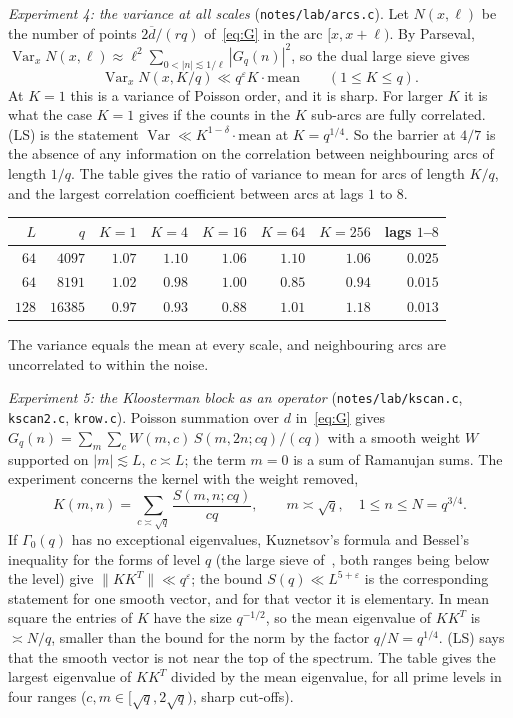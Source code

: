 \documentclass[11pt]{amsart}
\theoremstyle{definition}
\theoremstyle{remark}
\numberwithin{equation}{section}
\newcommand{\eps}{\varepsilon}
\newcommand{\inv}[1]{\overline{#1}}
\begin{document}
\emph{Experiment 4: the variance at all scales}
(\texttt{notes/lab/arcs.c}).  Let $N(x,\ell)$ be the number of points
$2\inv d/(rq)$ of~\eqref{eq:G} in the arc $[x,x+\ell)$.  By Parseval,
$\operatorname{Var}_xN(x,\ell)\approx\ell^2\sum_{0<|n|\lesssim1/\ell}|G_q(n)|^2$,
so the dual large sieve gives
\[
 \operatorname{Var}_xN(x,K/q)\ll q^{\eps}K\cdot\text{mean}\qquad(1\le K\le q).
\]
At $K=1$ this is a variance of Poisson order, and it is sharp.  For larger
$K$ it is what the case $K=1$ gives if the counts in the $K$ sub-arcs are
fully correlated.  (LS) is the statement
$\operatorname{Var}\ll K^{1-\delta}\cdot\text{mean}$ at $K=q^{1/4}$.  So the
barrier at $4/7$ is the absence of any information on the correlation
between neighbouring arcs of length $1/q$.  The table gives the ratio of
variance to mean for arcs of length $K/q$, and the largest correlation
coefficient between arcs at lags $1$ to $8$.

\medskip
\begin{center}
\begin{tabular}{rrrrrrrr}
$L$ & $q$ & $K=1$ & $K=4$ & $K=16$ & $K=64$ & $K=256$ & lags $1$--$8$\\ \hline
$64$ & $4097$ & $1.07$ & $1.10$ & $1.06$ & $1.10$ & $1.06$ & $0.025$\\
$64$ & $8191$ & $1.02$ & $0.98$ & $1.00$ & $0.85$ & $0.94$ & $0.015$\\
$128$ & $16385$ & $0.97$ & $0.93$ & $0.88$ & $1.01$ & $1.18$ & $0.013$
\end{tabular}
\end{center}
\medskip

The variance equals the mean at every scale, and neighbouring arcs are
uncorrelated to within the noise.

\emph{Experiment 5: the Kloosterman block as an operator}
(\texttt{notes/lab/kscan.c}, \texttt{kscan2.c}, \texttt{krow.c}).  Poisson
summation over $d$ in~\eqref{eq:G} gives
$G_q(n)=\sum_m\sum_cW(m,c)\,S(m,2n;cq)/(cq)$ with a smooth weight $W$
supported on $|m|\lesssim L$, $c\asymp L$; the term $m=0$ is a sum of
Ramanujan sums.  The experiment concerns the kernel with the weight removed,
\begin{equation}\label{eq:block}
 K(m,n)=\sum_{c\asymp\sqrt q}\frac{S(m,n;cq)}{cq},\qquad
 m\asymp\sqrt q,\quad 1\le n\le N=q^{3/4}.
\end{equation}
If $\Gamma_0(q)$ has no exceptional eigenvalues, Kuznetsov's formula and
Bessel's inequality for the forms of level $q$ (the large sieve
of~\cite{DI82}, both ranges being below the level) give
$\|KK^{T}\|\ll q^{\eps}$; the bound $S(q)\ll L^{5+\eps}$ is the corresponding
statement for one smooth vector, and for that vector it is elementary.  In
mean square the entries of $K$ have the size $q^{-1/2}$, so the mean
eigenvalue of $KK^{T}$ is $\asymp N/q$, smaller than the bound for the norm
by the factor $q/N=q^{1/4}$.  (LS) says that the smooth vector is not near
the top of the spectrum.  The table gives the
largest eigenvalue of $KK^{T}$ divided by the mean eigenvalue, for all prime
levels in four ranges ($c,m\in[\sqrt q,2\sqrt q)$, sharp cut-offs).
\end{document}
